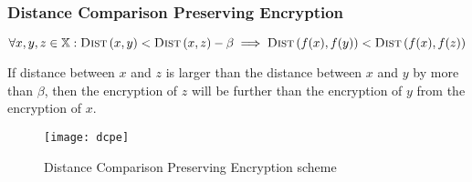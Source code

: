 	\begin{frame}[label={frame:dcpe}]

		\frametitle{Distance Comparison Preserving Encryption}

		\[
			\forall x, y, z \in \mathbb{X} : \algo{Dist}{x, y} < \algo{Dist}{x, z} - \beta \implies \algo{Dist}{f(x), f(y)} < \algo{Dist}{f(x), f(z)}
		\]

		If distance between $x$ and $z$ is larger than the distance between $x$ and $y$ by more than $\beta$, then the encryption of $z$ will be further than the encryption of $y$ from the encryption of $x$.

		\begin{figure}[h]
			\centering
			\texttt{[image: dcpe]}
			\caption{
				\the\columnwidth%
				Distance Comparison Preserving Encryption scheme \cite{dcpe} \\
				\hyperlink{frame:appendix:dcpe}{}
			}%
		\end{figure}

	\end{frame}

